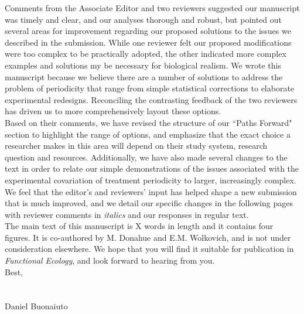 \documentclass[11 pt]{article}
\begin{document}
\noindent Comments from the Associate Editor and two reviewers suggested our manuscript was timely and clear, and our analyses thorough and robust, but pointed out several areas for improvement regarding our proposed solutions to the issues we described in the submission.
While one reviewer felt our proposed modifications were too complex to be practically adopted, the other indicated more complex examples and solutions my be necessary for biological realism. %
We wrote this manuscript because we believe there are a number of solutions to address the problem of periodicity that range from simple statistical corrections to elaborate experimental redesigns. Reconciling the contrasting feedback of the two reviewers has driven us to more comprehensively layout these options.\\%

\noindent Based on their comments, we have revised the structure of our ``Paths Forward" section to highlight the range of options, and emphasize that the exact choice a researcher makes in this area will depend on their  study system, research question and resources. Additionally, %
we have also made several changes to the text in order to relate our simple demonstrations of the issues associated with the experimental covariation of treatment periodicity to larger, increasingly complex. We feel that the editor's and reviewers' input has helped shape a new submission that is much improved, and we detail our specific changes in the following pages with reviewer comments in \emph{italics} and our responses in regular text.\\

\noindent The main text of this manuscript is X words in length and it contains four figures. It is co-authored by M. Donahue and E.M. Wolkovich, and is not under consideration elsewhere. We hope that you will find it suitable for publication in \textit{Functional Ecology}, and look forward to hearing from you.\\


\noindent Best,\\
\\\\



\noindent Daniel Buonaiuto
\end{document}
